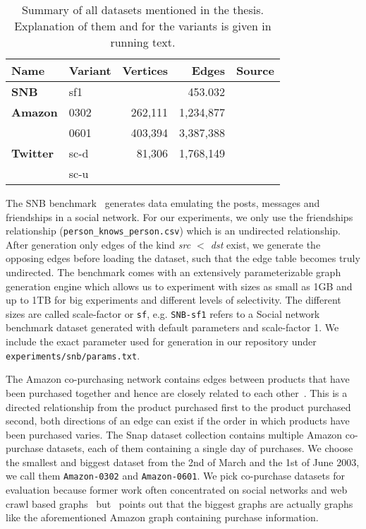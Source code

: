\begin{table}[]
    \centering
    \begin{tabular}{llrrl} \toprule
        Name    & Variant         &  Vertices   & Edges         & Source          \\ \midrule
        \textbf{SNB}    & sf1     &             & 453.032       & \cite{snb}      \\
        \textbf{Amazon} & 0302    & 262,111     &  1,234,877    & \cite{snapnets} \\
                        & 0601    & 403,394     & 3,387,388     & \cite{snapnets} \\
        \textbf{Twitter}& sc-d    & 81,306      & 1,768,149     & \cite{snapnets} \\  %
        & sc-u    &          &                                  & \cite{snapnets} \\ \bottomrule
    \end{tabular}
    \caption{Summary of all datasets mentioned in the thesis.
    Explanation of them and for the variants is given in running text.
    }
    \label{table:datasets}
\end{table}


The SNB benchmark~\cite{snb} generates data emulating the posts, messages and friendships in a social network.
For our experiments, we only use the friendships relationship (\texttt{person\_knows\_person.csv}) which is an undirected relationship.
After generation only edges of the kind \textit{src $<$ dst} exist, we generate the opposing edges before loading the dataset, such
that the edge table becomes truly undirected.
The benchmark comes with an extensively parameterizable graph generation engine
which allows us to experiment with sizes as small as 1GB and up to 1TB for big experiments and different levels of selectivity.
The different sizes are called scale-factor or \texttt{sf}, e.g. \texttt{SNB-sf1} refers to a Social network benchmark dataset generated with
default parameters and scale-factor 1.
We include the exact parameter used for generation in our repository under \texttt{experiments/snb/params.txt}. %

The Amazon co-purchasing network contains edges between products that have been purchased together and hence are closely related to each other~\cite{snapnets}.
This is a directed relationship from the product purchased first to the product purchased second, both directions of an edge can exist if the order in which
products have been purchased varies.
The Snap dataset collection contains multiple Amazon co-purchase datasets, each of them containing a single day of purchases.
We choose the smallest and biggest dataset from the 2nd of March and the 1st of June 2003, we call them \texttt{Amazon-0302} and
\texttt{Amazon-0601}.
We pick co-purchase datasets for evaluation because former work often concentrated on social networks and web crawl based
graphs~\cite{myria-detailed,ammar2018distributed} but~\cite{salihoglu2018} points out that the biggest graphs are actually graphs like
the aforementioned Amazon graph containing purchase information.

